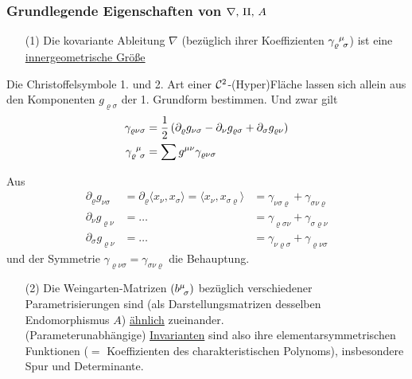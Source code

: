 \subsubsection{Grundlegende Eigenschaften von \(\nabla, \, \Rom 2, \, A\)}
\begin{enumerate}
 \item[(1)] Die kovariante Ableitung \(\nabla\) (bezüglich ihrer Koeffizienten \(\gamma_{\varrho \;\, \sigma}^{\;\,\mu}\)) ist eine \uline{innergeometrische Größe}
\end{enumerate}

\begin{satz}\label{satz215}
 Die Christoffelsymbole 1. und 2. Art einer \(\mathcal{C}^2\)-(Hyper)Fläche lassen sich allein aus den Komponenten \(g_{\varrho \sigma}\) der 1. Grundform bestimmen. Und zwar gilt
 \begin{align*}
  \gamma_{\varrho \nu \sigma} &= \frac12 \left( \partial_\varrho g_{\nu \sigma} - \partial_\nu g_{\varrho \sigma} + \partial_\sigma g_{\varrho \nu}\right) \\
  \gamma_{\varrho \;\, \sigma}^{\;\,\mu} &= \sum g^{\mu \nu} \gamma_{\varrho \nu \sigma}
 \end{align*}
\end{satz}

\begin{beweis}
 Aus 
 \begin{align*}
  \partial_\varrho g_{\nu \sigma} &= \partial_\varrho \langle x_\nu, x_\sigma \rangle = \langle x_\nu, x_{\sigma \varrho} \rangle &= \gamma_{\nu\sigma\varrho} + \gamma_{\sigma \nu \varrho} \\
  \partial_\nu g_{\varrho \nu} &= \dots &= \gamma_{\varrho \sigma \nu} + \gamma_{\sigma \varrho \nu} \\
  \partial_\sigma g_{\varrho \nu} &= \dots &= \gamma_{\nu \varrho \sigma} + \gamma_{\varrho \nu \sigma}
 \end{align*}
 und der Symmetrie \(\gamma_{\varrho \nu \sigma} = \gamma_{\sigma \nu \varrho}\) die Behauptung.
\end{beweis}

\begin{enumerate}
 \item[(2)] Die Weingarten-Matrizen \((b^{\mu}_{\;\,\sigma} )\) bezüglich verschiedener Parametrisierungen sind (als Darstellungsmatrizen desselben Endomorphismus \(A\)) \uline{ähnlich} zueinander. \\
 (Parameterunabhängige) \uline{Invarianten} sind also ihre elementarsymmetrischen Funktionen (\(=\) Koeffizienten des charakteristischen Polynoms), insbesondere Spur und Determinante.
\end{enumerate}

